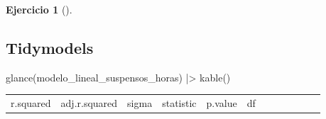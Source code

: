 \documentclass[
  a4paper,
]{scrreport}
\newenvironment{Shaded}{\begin{snugshade}}{\end{snugshade}}
\newcommand{\FunctionTok}[1]{\textcolor[rgb]{0.28,0.35,0.67}{#1}}
\newcommand{\NormalTok}[1]{\textcolor[rgb]{0.00,0.23,0.31}{#1}}
\newcommand{\SpecialCharTok}[1]{\textcolor[rgb]{0.37,0.37,0.37}{#1}}
\theoremstyle{definition}
\newtheorem{exercise}{Ejercicio}[chapter]
\theoremstyle{remark}
\begin{document}
\begin{exercise}[]
\begin{enumerate}
\begin{tcolorbox}
  \section{Tidymodels}

\begin{Shaded}
\begin{Highlighting}[]
\FunctionTok{glance}\NormalTok{(modelo\_lineal\_suspensos\_horas) }\SpecialCharTok{|\textgreater{}} \FunctionTok{kable}\NormalTok{()}
\end{Highlighting}
\end{Shaded}

  \begin{longtable}[]{@{}
    >{\raggedleft\arraybackslash}p{}
    >{\raggedleft\arraybackslash}p{}
    >{\raggedleft\arraybackslash}p{}
    >{\raggedleft\arraybackslash}p{}
    >{\raggedleft\arraybackslash}p{}
    >{\raggedleft\arraybackslash}p{}
    >{\raggedleft\arraybackslash}p{}
    >{\raggedleft\arraybackslash}p{}
    >{\raggedleft\arraybackslash}p{}
    >{\raggedleft\arraybackslash}p{}
    >{\raggedleft\arraybackslash}p{}
    >{\raggedleft\arraybackslash}p{}@{}}
  \toprule\noalign{}
  \begin{minipage}[b]{\linewidth}\raggedleft
  r.squared
  \end{minipage} & \begin{minipage}[b]{\linewidth}\raggedleft
  adj.r.squared
  \end{minipage} & \begin{minipage}[b]{\linewidth}\raggedleft
  sigma
  \end{minipage} & \begin{minipage}[b]{\linewidth}\raggedleft
  statistic
  \end{minipage} & \begin{minipage}[b]{\linewidth}\raggedleft
  p.value
  \end{minipage} & \begin{minipage}[b]{\linewidth}\raggedleft
  df
  \end{minipage} & \begin{minipage}[b]{\linewidth}\raggedleft

\end{minipage}
\end{longtable}
\end{tcolorbox}
\end{enumerate}
\end{exercise}
\end{document}
